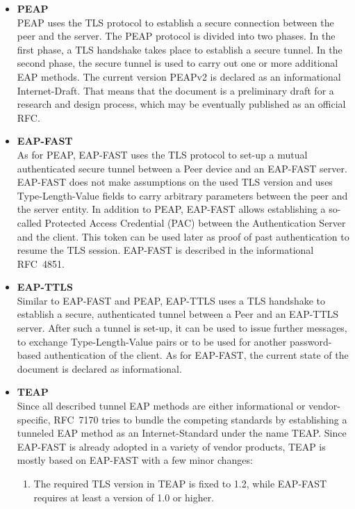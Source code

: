 \begin{itemize}
  \item \textbf{\ac{PEAP}} \\
  \ac{PEAP} uses the \ac{TLS} protocol to establish a secure connection between the peer and the server. The \ac{PEAP} protocol is divided into two phases. In the first phase, a TLS handshake takes place to establish a secure tunnel. In the second phase, the secure tunnel is used to carry out one or more additional \ac{EAP} methods. The current version \ac{PEAP}v2 is declared as an informational Internet-Draft. That means that the document is a preliminary draft for a research and design process, which may be eventually published as an official RFC.
  \item \textbf{EAP-FAST} \\
  As for \ac{PEAP}, EAP-FAST uses the \ac{TLS} protocol to set-up a mutual authenticated secure tunnel between a Peer device and an EAP-FAST server. EAP-FAST does not make assumptions on the used TLS version and uses Type-Length-Value fields to carry arbitrary parameters between the peer and the server entity. In addition to \ac{PEAP}, EAP-FAST allows establishing a so-called Protected Access Credential (PAC) between the Authentication Server and the client. This token can be used later as proof of past authentication to resume the TLS session. EAP-FAST is described in the informational RFC~4851\cite{rfc4851}.  
  \item \textbf{EAP-TTLS} \\
  Similar to EAP-FAST and \ac{PEAP}, EAP-TTLS uses a TLS handshake to establish a secure, authenticated tunnel between a Peer and an EAP-TTLS server. After such a tunnel is set-up, it can be used to issue further messages, to exchange Type-Length-Value pairs or to be used for another password-based authentication of the client. As for EAP-FAST, the current state of the document is declared as informational.
  \item \textbf{TEAP} \\
  Since all described tunnel \ac{EAP} methods are either informational or vendor-specific, RFC~7170\cite{rfc7170} tries to bundle the competing standards by establishing a tunneled \ac{EAP} method as an Internet-Standard under the name TEAP. Since EAP-FAST is already adopted in a variety of vendor products, TEAP is mostly based on EAP-FAST with a few minor changes:
  \begin{enumerate}
    \item The required TLS version in TEAP is fixed to 1.2, while EAP-FAST requires at least a version of 1.0 or higher.

\end{enumerate}
\end{itemize}
